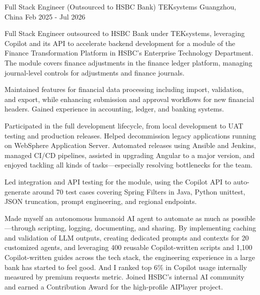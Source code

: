 
\begin{cventries}

  \cventry
    {Full Stack Engineer (Outsourced to HSBC Bank)} %
    {TEKsystems} %
    {Guangzhou, China} %
    {Feb 2025 - Jul 2026} %
    {
      \begin{cvitems} %
        \item {Full Stack Engineer outsourced to HSBC Bank under TEKsystems, leveraging Copilot and its API to accelerate backend development for a module of the Finance Transformation Platform in HSBC's Enterprise Technology Department. The module covers finance adjustments in the finance ledger platform, managing journal-level controls for adjustments and finance journals.}
        \item {Maintained features for financial data processing including import, validation, and export, while enhancing submission and approval workflows for new financial headers. Gained experience in accounting, ledger, and banking systems.}
        \item {Participated in the full development lifecycle, from local development to UAT testing and production releases. Helped decommission legacy applications running on WebSphere Application Server. Automated releases using Ansible and Jenkins, managed CI/CD pipelines, assisted in upgrading Angular to a major version, and enjoyed tackling all kinds of tasks—especially resolving bottlenecks for the team.}
        \item {Led integration and API testing for the module, using the Copilot API to auto-generate around 70 test cases covering Spring Filters in Java, Python unittest, JSON truncation, prompt engineering, and regional endpoints.}
        \item {Made myself an autonomous humanoid AI agent to automate as much as possible—through scripting, logging, documenting, and sharing. By implementing caching and validation of LLM outputs, creating dedicated prompts and contexts for 20 customized agents, and leveraging 400 reusable Copilot-written scripts and 1,100 Copilot-written guides across the tech stack, the engineering experience in a large bank has started to feel good. And I ranked top 6\% in Copilot usage internally measured by premium requests metric. Joined HSBC's internal AI community and earned a Contribution Award for the high-profile AIPlayer project.}

\end{cvitems}}
\end{cventries}
